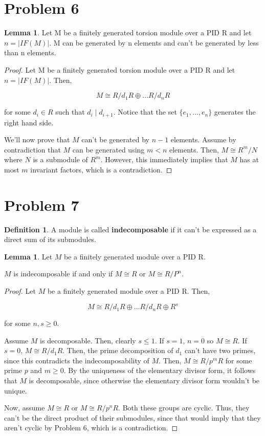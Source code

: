 \documentclass{article}
\theoremstyle{definition}
\newtheorem{definition}{Definition}
\newtheorem{lemma}[theorem]{Lemma}
\begin{document}
\section{Problem 6}

\begin{lemma}
    Let M be a finitely generated torsion module over a PID R and let $n = \lvert IF(M) \rvert$. M can be generated by n elements and can't be generated by less than n elements.
\end{lemma}
\begin{proof}
    Let M be a finitely generated torsion module over a PID R and let $n = \lvert IF(M) \rvert$. Then, 

    \[ M \cong R/d_{1}R \oplus ... R/d_{n}R\]

    for some $d_{i} \in R$ such that $d_{i} \mid d_{i + 1}$. Notice that the set $\{e_{1},...,e_{n}\}$ generates the right hand side. 
    
    We'll now prove that $M$ can't be generated by $n-1$ elements. Assume by contradiction that $M$ can be generated using $m < n$ elements. Then, $M \cong R^{m}/N$ where $N$ is a submodule of $R^{m}$. However, this immediately implies that $M$ has at most $m$ invariant factors, which is a contradiction.
\end{proof}

\section{Problem 7}

\begin{definition}
    A module is called \textbf{indecomposable} if it can't be expressed as a direct sum of its submodules.
\end{definition}

\begin{lemma}
    Let $M$ be a finitely generated module over a PID R.

    $M$ is indecomposable if and only if $M \cong R$ or $M \cong R/P^{n}$.
\end{lemma}
\begin{proof}
    Let $M$ be a finitely generated module over a PID R. Then,

    \[ M \cong R/d_{1}R \oplus ... R/d_{n}R \oplus R^{s}\]

    for some $n,s \geq 0$.

    Assume $M$ is decomposable. Then, clearly $s \leq 1$. If $s = 1$, $n = 0$ so $M \cong R$. If $s = 0$, $M \cong R/d_{1}R$. Then, the prime decomposition of $d_{1}$ can't have two primes, since this contradicts the indecomposability of $M$. Then, $M \cong R/p^{m}R$ for some prime $p$ and $m \geq 0$. By the uniqueness of the elementary divisor form, it follows that $M$ is decomposable, since otherwise the elementary divisor form wouldn't be unique.

    Now, assume $M \cong R$ or $M \cong R/p^{n}R$. Both these groups are cyclic. Thus, they can't be the direct product of their submodules, since that would imply that they aren't cyclic by Problem 6, which is a contradiction.
\end{proof}
\end{document}
